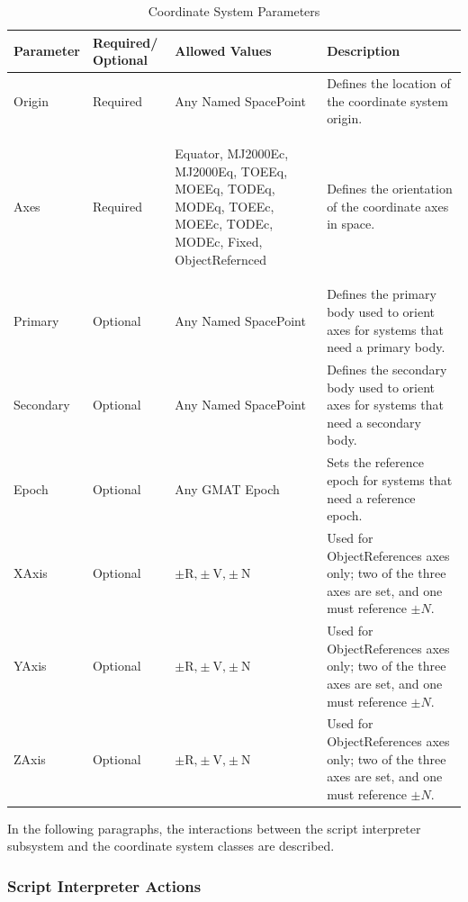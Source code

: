 %
\begin{table}
\caption{\label{table:CSParms}Coordinate System Parameters}
\begin{center}\begin{tabular}{|p{0.8in}|p{0.9in}|p{1.3in}|p{2.5in}|}
\hline
Parameter&
Required/ Optional&
Allowed Values&
Description\tabularnewline
\hline
\hline
Origin&
Required&
\begin{flushleft}Any Named SpacePoint\end{flushleft}&
Defines the location of the coordinate system origin.\tabularnewline
\hline
Axes&
Required&
\begin{flushleft}Equator, MJ2000Ec, MJ2000Eq, TOEEq, MOEEq, TODEq,
MODEq, TOEEc, MOEEc, TODEc, MODEc, Fixed, ObjectRefernced\end{flushleft}&
Defines the orientation of the coordinate axes in space.\tabularnewline
\hline
Primary&
Optional&
\begin{flushleft}Any Named SpacePoint\end{flushleft}&
Defines the primary body used to orient axes for systems that need
a primary body.\tabularnewline
\hline
Secondary&
Optional&
\begin{flushleft}Any Named SpacePoint\end{flushleft}&
Defines the secondary body used to orient axes for systems that need
a secondary body.\tabularnewline
\hline
Epoch&
Optional&
Any GMAT Epoch&
Sets the reference epoch for systems that need a reference epoch.\tabularnewline
\hline
XAxis&
Optional&
$\pm\textrm{R,}\pm\textrm{V,}\pm\textrm{N}$&
Used for ObjectReferences axes only; two of the three axes are set,
and one must reference $\pm N$.\tabularnewline
\hline
YAxis&
Optional&
$\pm\textrm{R,}\pm\textrm{V,}\pm\textrm{N}$&
Used for ObjectReferences axes only; two of the three axes are set,
and one must reference $\pm N$.\tabularnewline
\hline
ZAxis&
Optional&
$\pm\textrm{R,}\pm\textrm{V,}\pm\textrm{N}$&
Used for ObjectReferences axes only; two of the three axes are set,
and one must reference $\pm N$.\tabularnewline
\hline
\end{tabular}\end{center}
\end{table}

In the following paragraphs, the interactions between the script interpreter subsystem and the
coordinate system classes are described.

\subsubsection{Script Interpreter Actions}

